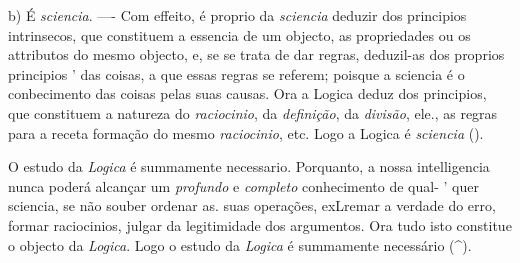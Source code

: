 b) É \emph{sciencia}. ---- Com effeito, é proprio da \emph{sciencia} deduzir dos principios intrinsecos, que constituem a essencia de um objecto, as propriedades ou os attributos do mesmo objecto, e, se se trata de dar regras, deduzil-as dos proprios principios ' das coisas, a que essas regras se referem; poisque a sciencia é o conbecimento das coisas pelas suas causas. Ora a Logica deduz dos principios, que constituem a natureza do \emph{raciocinio}, da \emph{definição}, da \emph{divisão}, ele., as regras para a receta formação do mesmo \emph{raciocinio}, etc. Logo a Logica é \emph{sciencia} ().


  
O estudo da \emph{Logica} é summamente necessario. Porquanto, a nossa intelligencia nunca poderá alcançar um \emph{profundo} e \emph{completo} conhecimento de qual- ' quer sciencia, se não souber ordenar as. suas operações, exLremar a verdade do erro, formar raciocinios, julgar da legitimidade dos argumentos. Ora tudo isto constitue o objecto da \emph{Logica}. Logo o estudo da \emph{Logica} é summamente necessário (\textasciicircum{}).


